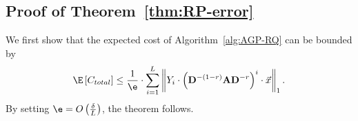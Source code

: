 



\subsection{Proof of Theorem~\ref{thm:RP-error}}
We first show that the expected cost of Algorithm~\ref{alg:AGP-RQ} can be bounded by
\vspace{-2mm}
\begin{equation}\nonumber
\vspace{-1mm}
\E \left[ C_{total} \right] \le \frac{1}{\e}\cdot \sum_{i=1}^{L} \left\| Y_i \cdot \left(\mathbf{D}^{-(1-r)}\mathbf{A}\mathbf{D}^{-r} \right)^i \cdot \vec{x} \right\|_1. 
\end{equation}
By setting $\e=O\left(\frac{\delta}{L}\right)$, the theorem follows. 
 
